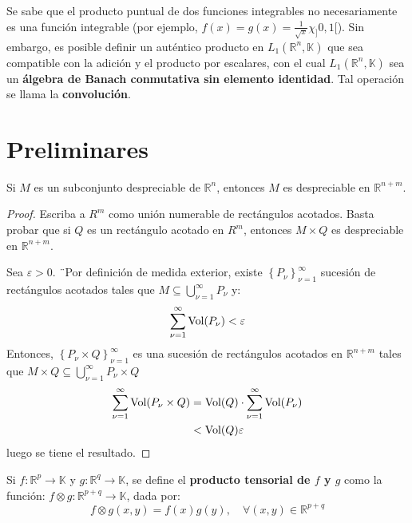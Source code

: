 \documentclass[12pt]{report}
\theoremstyle{largebreak}
\newcommand\cf[3]{\ensuremath{#1:#2\rightarrow#3}}
\begin{document}
    Se sabe que el producto puntual de dos funciones integrables no necesariamente es una función integrable (por ejemplo, $f(x)=g(x)=\frac{1}{\sqrt{x}}\chi_]0,1[$). Sin embargo, es posible definir un auténtico producto en $L_1(\mathbb{R}^n,\mathbb{K})$ que sea compatible con la adición y el producto por escalares, con el cual $L_1(\mathbb{R}^n,\mathbb{K})$ sea un \textbf{álgebra de Banach conmutativa sin elemento identidad}. Tal operación se llama la \textbf{convolución}.

    \section{Preliminares}

    \begin{lema}
        Si $M$ es un subconjunto despreciable de $\mathbb{R}^n$, entonces $M$ es despreciable en $\mathbb{R}^{n+m}$.
    \end{lema}

    \begin{proof}
        Escriba a $R^m$ como unión numerable de rectángulos acotados. Basta probar que si $Q$ es un rectángulo acotado en $R^m$, entonces $M\times Q$ es despreciable en $\mathbb{R}^{ n+m}$.

        Sea $\varepsilon>0$. ¨Por definición de medida exterior, existe $\left\{P_\nu \right\}_{\nu=1}^\infty$ sucesión de rectángulos acotados tales que $M\subseteq \bigcup_{ \nu=1}^\infty P_\nu$ y:
        \begin{equation*}
            \sum_{ \nu=1}^{\infty}\textup{Vol}(P_\nu)<\varepsilon
        \end{equation*}
        Entonces, $\left\{P_\nu\times Q \right\}_{\nu=1}^\infty$ es una sucesión de rectángulos acotados en $\mathbb{R}^{n+m}$ tales que $M\times Q\subseteq \bigcup_{ \nu=1}^\infty P_\nu\times Q$
        \begin{equation*}
            \begin{split}
                \sum_{ \nu=1}^{\infty}\textup{Vol}(P_\nu\times Q)&=\textup{Vol}(Q)\cdot\sum_{ \nu=1}^{\infty}\textup{Vol}(P_\nu)\\
                &<\textup{Vol}(Q)\varepsilon\\
            \end{split}
        \end{equation*}
        luego se tiene el resultado.
    \end{proof}

    \begin{mydef}
        Si $\cf{f}{\mathbb{R}^p}{\mathbb{K}}$ y $\cf{g}{\mathbb{R}^q}{\mathbb{K}}$, se define el \textbf{producto tensorial de $f$ y $g$} como la función: $\cf{f\otimes g}{\mathbb{R}^{ p+q}}{\mathbb{K}}$, dada por:
        \begin{equation*}
            f\otimes g(x,y)=f(x)g(y),\quad\forall (x,y)\in\mathbb{R}^{ p+q}
        \end{equation*}
    \end{mydef}
\end{document}
